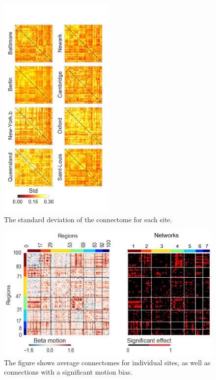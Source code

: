 \documentclass[authoryear]{elsarticle}
\begin{document}
\begin{figure}[htbp]
\centering
\includegraphics[width=0.50\textwidth]{../figures/connectome_std_multisite2.pdf}
\caption[]{
The standard deviation of the connectome for each site.
}
\label{fig_std_connectomes}
\end{figure}


\begin{figure}[htbp]
\begin{center}
\includegraphics[width=\linewidth]{../figures/effect_motion.png}
\end{center}
\caption[Connectome variability across sites]{
The figure shows average connectomes for individual sites, as well as connections with a significant motion bias.
}
\label{fig_connectome_variability_motion}
\end{figure}
\end{document}
